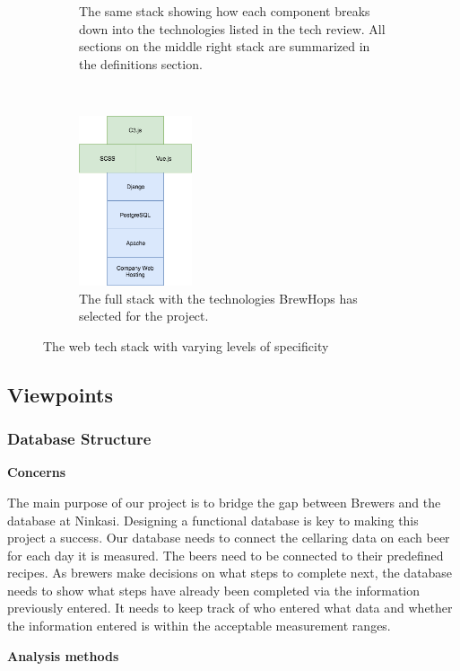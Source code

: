 \documentclass[draftclsnofoot,onecolumn,letterpaper,10pt]{IEEEtran}
\begin{document}
\begin{figure}[h]
\begin{subfigure}[b]{0.2\textwidth}
        \caption{The same stack showing how each component breaks down into the technologies listed in the tech review. All sections on the middle right stack are summarized in the definitions section. }
        \label{fig:general_tech}
    \end{subfigure}
		~
    \begin{subfigure}[b]{0.2\textwidth}
        \includegraphics[height=5cm]{images/stack/chosen_tech}
        \caption{The full stack with the technologies BrewHops has selected for the project.}
        \label{fig:chosen_tech}
    \end{subfigure}
    \caption{The web tech stack with varying levels of specificity}\label{fig:animals}
\end{figure}


	\subsection{Viewpoints}
		\subsubsection{Database Structure}
			\textbf{Concerns}

			The main purpose of our project is to bridge the gap between Brewers and the database at Ninkasi. Designing a functional database is key to making this project a success.
			Our database needs to connect the cellaring data on each beer for each day it is measured.
			The beers need to be connected to their predefined recipes.
			As brewers make decisions on what steps to complete next, the database needs to show what steps have already been completed via the information previously entered.
			It needs to keep track of who entered what data and whether the information entered is within the acceptable measurement ranges.


			\textbf{Analysis methods}
\end{document}
